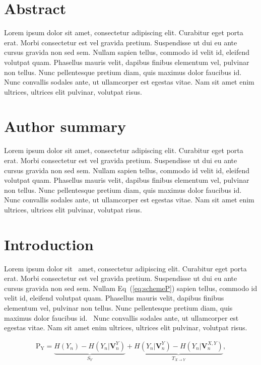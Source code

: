 \documentclass[10pt,letterpaper]{article}
\begin{document}
\section*{Abstract}
Lorem ipsum dolor sit amet, consectetur adipiscing elit. Curabitur eget porta erat. Morbi consectetur est vel gravida pretium. Suspendisse ut dui eu ante cursus gravida non sed sem. Nullam sapien tellus, commodo id velit id, eleifend volutpat quam. Phasellus mauris velit, dapibus finibus elementum vel, pulvinar non tellus. Nunc pellentesque pretium diam, quis maximus dolor faucibus id. Nunc convallis sodales ante, ut ullamcorper est egestas vitae. Nam sit amet enim ultrices, ultrices elit pulvinar, volutpat risus.


\section*{Author summary}
Lorem ipsum dolor sit amet, consectetur adipiscing elit. Curabitur eget porta erat. Morbi consectetur est vel gravida pretium. Suspendisse ut dui eu ante cursus gravida non sed sem. Nullam sapien tellus, commodo id velit id, eleifend volutpat quam. Phasellus mauris velit, dapibus finibus elementum vel, pulvinar non tellus. Nunc pellentesque pretium diam, quis maximus dolor faucibus id. Nunc convallis sodales ante, ut ullamcorper est egestas vitae. Nam sit amet enim ultrices, ultrices elit pulvinar, volutpat risus.

\linenumbers

\section*{Introduction}
Lorem ipsum dolor sit~\cite{bib1} amet, consectetur adipiscing elit. Curabitur eget porta erat. Morbi consectetur est vel gravida pretium. Suspendisse ut dui eu ante cursus gravida non sed sem. Nullam Eq~(\ref{eq:schemeP}) sapien tellus, commodo id velit id, eleifend volutpat quam. Phasellus mauris velit, dapibus finibus elementum vel, pulvinar non tellus. Nunc pellentesque pretium diam, quis maximus dolor faucibus id.~\cite{bib2} Nunc convallis sodales ante, ut ullamcorper est egestas vitae. Nam sit amet enim ultrices, ultrices elit pulvinar, volutpat risus.

\begin{eqnarray}
\label{eq:schemeP}
	\mathrm{P_Y} = \underbrace{H(Y_n) - H(Y_n|\mathbf{V}^{Y}_{n})}_{S_Y} + \underbrace{H(Y_n|\mathbf{V}^{Y}_{n})- H(Y_n|\mathbf{V}^{X,Y}_{n})}_{T_{X\rightarrow Y}},
\end{eqnarray}
\end{document}

